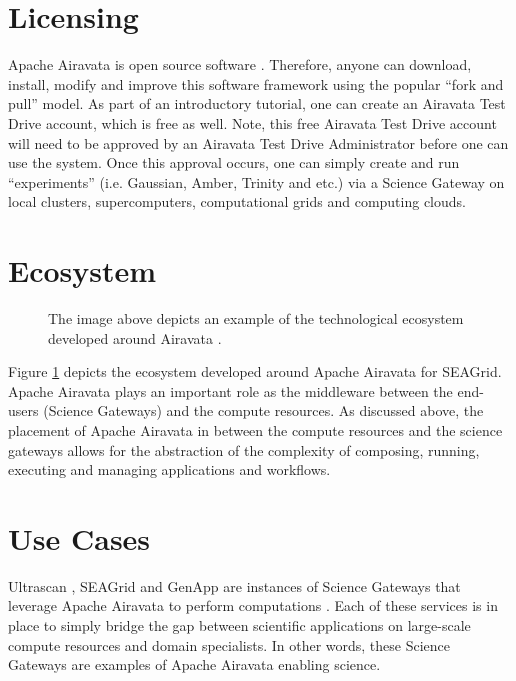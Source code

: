 \documentclass[9pt,twocolumn,twoside]{../../styles/osajnl}
\begin{document}
\section{Licensing} \label{licensing}
Apache Airavata is open source software \cite{www-source}. Therefore,
anyone can download, install, modify and improve this software
framework using the popular ``fork and pull'' model. As part of an
introductory tutorial, one can create an Airavata Test Drive account,
which is free as well. Note, this free Airavata Test Drive account
will need to be approved by an Airavata Test Drive Administrator
before one can use the system. Once this approval occurs, one can
simply create and run ``experiments'' (i.e. Gaussian, Amber, Trinity
and etc.) via a Science Gateway on local clusters, supercomputers,
computational grids and computing clouds.

\section{Ecosystem} \label{ecosystem}
\begin{figure}[htbp]
\centering
{}
\caption{The image above depicts an example of the technological
  ecosystem developed around Airavata \cite{www-airavata-ecosystem}.}
\label{fig:airavata-ecosystem}
\end{figure}
Figure \ref{fig:airavata-ecosystem} depicts the ecosystem developed
around Apache Airavata for SEAGrid. Apache Airavata plays an important role as the
middleware between the end-users (Science Gateways) and the compute
resources. As discussed above, the placement of Apache Airavata in
between the compute resources and the science gateways allows for the
abstraction of the complexity of composing, running, executing and
managing applications and workflows.

\section{Use Cases} \label{use}
Ultrascan \cite{www-ultrascan}, SEAGrid \cite{www-seagrid} and GenApp
\cite{www-genapp} are instances of Science Gateways that leverage
Apache Airavata to perform computations \cite{www-airavata}. Each of
these services is in place to simply bridge the gap between
scientific applications on large-scale compute resources and domain
specialists. In other words, these Science Gateways are examples of
Apache Airavata enabling science.
\end{document}
